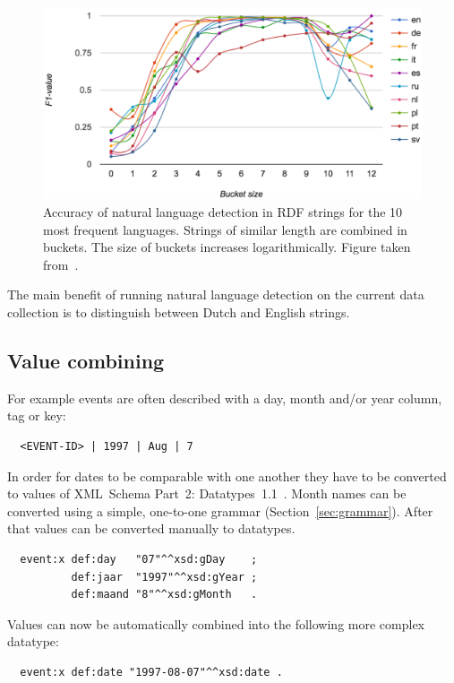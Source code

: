 \documentclass[a4paper]{scrartcl}
\begin{document}
\begin{figure}
  \includegraphics[width=\linewidth]{img/natlang.png}
  \caption{Accuracy of natural language detection in RDF strings for
    the 10 most frequent languages.  Strings of similar length are
    combined in buckets.  The size of buckets increases
    logarithmically.  Figure taken from~\cite{Beek2016c}.}
  \label{fig:natlang}
\end{figure}

The main benefit of running natural language detection on the current
data collection is to distinguish between Dutch and English strings.


\subsection{Value combining}

For example events are often described with a day, month and/or year
column, tag or key:

\begin{verbatim}
  <EVENT-ID> | 1997 | Aug | 7
\end{verbatim}

In order for dates to be comparable with one another they have to be
converted to values of XML~Schema Part~2:
Datatypes~1.1~\cite{Peterson2012}.  Month names can be converted using
a simple, one-to-one grammar (Section~\ref{sec:grammar}).  After that
values can be converted manually to datatypes.

\begin{verbatim}
  event:x def:day   "07"^^xsd:gDay    ;
          def:jaar  "1997"^^xsd:gYear ;
          def:maand "8"^^xsd:gMonth   .
\end{verbatim}

Values can now be automatically combined into the following more
complex datatype:

\begin{verbatim}
  event:x def:date "1997-08-07"^^xsd:date .
\end{verbatim}
\end{document}
